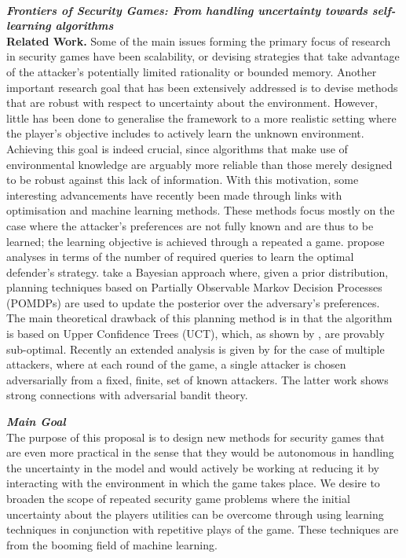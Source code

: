 \noindent \textbf{\textit{\\Frontiers of Security Games: From handling uncertainty towards self-learning algorithms}}\\
\textbf{Related Work.}
Some of the main issues forming the primary focus of research in security games have been scalability, or devising strategies that take advantage of the attacker's potentially limited rationality or bounded memory\cite{tambe2012game}. Another important research goal that has been extensively addressed is to devise methods that are robust with respect to uncertainty about the environment\cite{Nguyen14RO, aghassi2006robust}.
However, little has been done to generalise the framework to a more realistic setting where the player's objective includes to actively learn the unknown environment. Achieving this goal is indeed crucial, since algorithms that make use of environmental knowledge are arguably more reliable than those merely designed to be robust against this lack of information. With this motivation, some interesting advancements have recently been made through links with optimisation and machine learning methods. 
These methods focus mostly on the case where the attacker's preferences are not fully known and are thus to be learned; the learning objective is achieved through a repeated a game.  \cite{blum2014learning, letchford2009learning} propose analyses in terms of the number of required queries to learn the optimal defender's strategy. 
\cite{Marecki12PR, qian2014online} take a Bayesian approach where, given a prior distribution, planning techniques based on Partially Observable Markov Decision Processes (POMDPs) are used to update the posterior over the adversary's preferences.
The main theoretical drawback of this planning method is in that the algorithm is based on Upper Confidence Trees (UCT), which, as shown by  \cite{munos2014bandits}, are provably sub-optimal. 
Recently an extended analysis is given by \cite{Balcan15CR}  for the case of multiple attackers, where at each round of the game, a single attacker is chosen adversarially from a fixed, finite, set of known attackers. The latter work shows strong connections with adversarial bandit theory. 



\noindent \textit{\textbf{Main Goal}}\\ The purpose of this proposal is to design new methods for security games that are even more practical  in the sense that they would be autonomous in handling the uncertainty in the model and would actively be working at reducing it by interacting with the environment in which the game takes place. We desire to broaden the scope of repeated security game problems where the initial uncertainty about the players utilities can be overcome through using learning techniques  in conjunction with  repetitive plays of the game. These techniques are from the booming field of machine learning.



